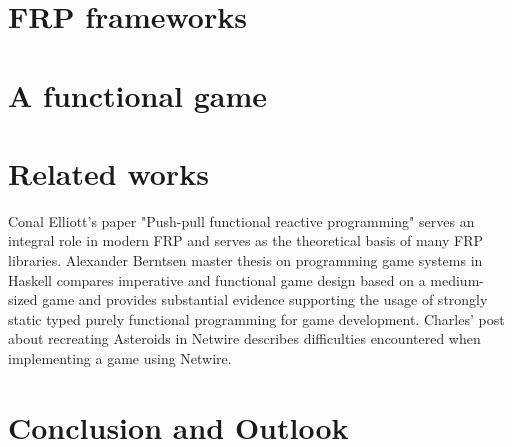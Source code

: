 \documentclass{article}
\begin{document}
\section{FRP frameworks}
\label{sec:frameworks}

\section{A functional game}
\label{sec:game}

\section{Related works}
\label{sec:related}
Conal Elliott's paper "Push-pull functional reactive programming" \cite{Elliott2009-push-pull-frp} serves an integral role in modern FRP
and serves as the theoretical basis of many FRP libraries. Alexander Berntsen master thesis on programming game systems in Haskell \cite{Berntsen2014-game-systems-haskell} compares imperative and functional game design based on a medium-sized game and provides substantial evidence supporting the usage of strongly static typed purely functional programming for game development. Charles' post about recreating Asteroids in Netwire \cite{asteroids} describes difficulties encountered when implementing a game using Netwire.
\section{Conclusion and Outlook}
\label{sec:conclusion}



\end{document}
